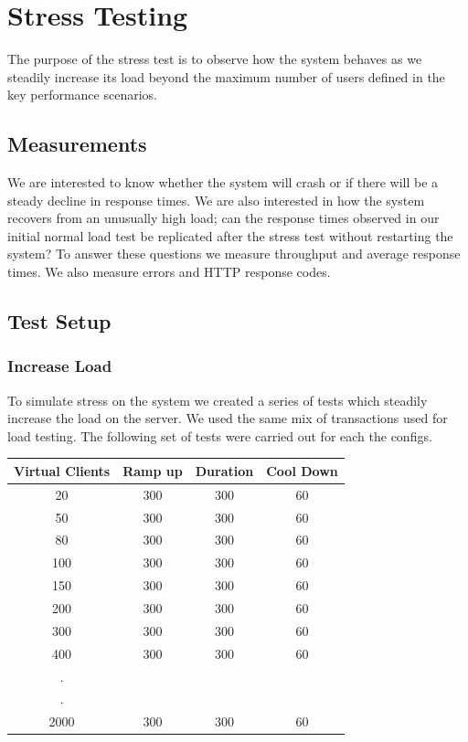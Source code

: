 \chapter{Stress Testing}
The purpose of the stress test is to observe how the system behaves as we steadily increase its load beyond the maximum number of users defined in the key performance scenarios. 

\section{Measurements}
We are interested to know whether the system will crash or if there will be a steady decline in response times. We are also interested in how the system recovers from an unusually high load; can the response times observed in our initial normal load test be replicated after the stress test without restarting the system? To answer these questions we measure throughput and average response times. We also measure errors and HTTP response codes.

\section{Test Setup}

\subsection{Increase Load}
To simulate stress on the system we created a series of tests which steadily increase the load on the server. We used the same mix of transactions used for load testing. The following set of tests were carried out for each the configs.


\begin{center}
\begin{tabular}{| c | c | c | c |}
\hline
Virtual Clients & Ramp up & Duration & Cool Down \\
\hline
20 & 300 & 300 & 60 \\ 
50 & 300 & 300 & 60 \\ 
80 & 300 & 300 & 60 \\ 
100 & 300 & 300 & 60 \\ 
150 & 300 & 300 & 60 \\
200 & 300 & 300 & 60 \\ 
300 & 300 & 300 & 60 \\ 
400 & 300 & 300 & 60 \\ 
. &  &  & \\ 
. &  &  & \\ 
2000 & 300 & 300 & 60 \\ 
\hline
\end{tabular}
\end{center}

